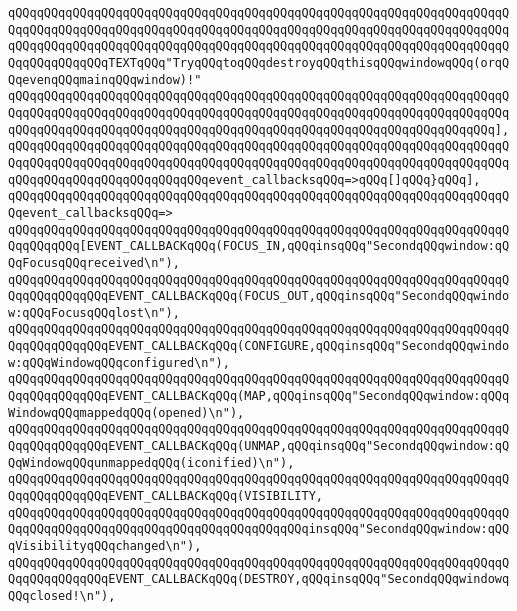 \verb|qQQqqQQqqQQqqQQqqQQqqQQqqQQqqQQqqQQqqQQqqQQqqQQqqQQqqQQqqQQqqQQqqQQqqQQqqQQqqQQqqQQqqQQqqQQqqQQqqQQqqQQqqQQqqQQqqQQqqQQqqQQqqQQqqQQqqQQqqQQqqQQqqQQqqQQqqQQqqQQqqQQqqQQqqQQqqQQqqQQqqQQqqQQqqQQqqQQqqQQqqQQqqQQqqQQqqQQqqQQqqQQqTEXTqQQq"TryqQQqtoqQQqdestroyqQQqthisqQQqwindowqQQq(orqQQqevenqQQqmainqQQqwindow)!"|\newline
\verb|qQQqqQQqqQQqqQQqqQQqqQQqqQQqqQQqqQQqqQQqqQQqqQQqqQQqqQQqqQQqqQQqqQQqqQQqqQQqqQQqqQQqqQQqqQQqqQQqqQQqqQQqqQQqqQQqqQQqqQQqqQQqqQQqqQQqqQQqqQQqqQQqqQQqqQQqqQQqqQQqqQQqqQQqqQQqqQQqqQQqqQQqqQQqqQQqqQQqqQQqqQQqqQQq],|\newline
\verb|qQQqqQQqqQQqqQQqqQQqqQQqqQQqqQQqqQQqqQQqqQQqqQQqqQQqqQQqqQQqqQQqqQQqqQQqqQQqqQQqqQQqqQQqqQQqqQQqqQQqqQQqqQQqqQQqqQQqqQQqqQQqqQQqqQQqqQQqqQQqqQQqqQQqqQQqqQQqqQQqqQQqqQQqevent_callbacksqQQq=>qQQq[]qQQq}qQQq],|\newline
\verb|qQQqqQQqqQQqqQQqqQQqqQQqqQQqqQQqqQQqqQQqqQQqqQQqqQQqqQQqqQQqqQQqqQQqqQQqevent_callbacksqQQq=>|\newline
\verb|qQQqqQQqqQQqqQQqqQQqqQQqqQQqqQQqqQQqqQQqqQQqqQQqqQQqqQQqqQQqqQQqqQQqqQQqqQQqqQQq[EVENT_CALLBACKqQQq(FOCUS_IN,qQQqinsqQQq"SecondqQQqwindow:qQQqFocusqQQqreceived\n"),|\newline
\verb|qQQqqQQqqQQqqQQqqQQqqQQqqQQqqQQqqQQqqQQqqQQqqQQqqQQqqQQqqQQqqQQqqQQqqQQqqQQqqQQqqQQqEVENT_CALLBACKqQQq(FOCUS_OUT,qQQqinsqQQq"SecondqQQqwindow:qQQqFocusqQQqlost\n"),|\newline
\verb|qQQqqQQqqQQqqQQqqQQqqQQqqQQqqQQqqQQqqQQqqQQqqQQqqQQqqQQqqQQqqQQqqQQqqQQqqQQqqQQqqQQqEVENT_CALLBACKqQQq(CONFIGURE,qQQqinsqQQq"SecondqQQqwindow:qQQqWindowqQQqconfigured\n"),|\newline
\verb|qQQqqQQqqQQqqQQqqQQqqQQqqQQqqQQqqQQqqQQqqQQqqQQqqQQqqQQqqQQqqQQqqQQqqQQqqQQqqQQqqQQqEVENT_CALLBACKqQQq(MAP,qQQqinsqQQq"SecondqQQqwindow:qQQqWindowqQQqmappedqQQq(opened)\n"),|\newline
\verb|qQQqqQQqqQQqqQQqqQQqqQQqqQQqqQQqqQQqqQQqqQQqqQQqqQQqqQQqqQQqqQQqqQQqqQQqqQQqqQQqqQQqEVENT_CALLBACKqQQq(UNMAP,qQQqinsqQQq"SecondqQQqwindow:qQQqWindowqQQqunmappedqQQq(iconified)\n"),|\newline
\verb|qQQqqQQqqQQqqQQqqQQqqQQqqQQqqQQqqQQqqQQqqQQqqQQqqQQqqQQqqQQqqQQqqQQqqQQqqQQqqQQqqQQqEVENT_CALLBACKqQQq(VISIBILITY,|\newline
\verb|qQQqqQQqqQQqqQQqqQQqqQQqqQQqqQQqqQQqqQQqqQQqqQQqqQQqqQQqqQQqqQQqqQQqqQQqqQQqqQQqqQQqqQQqqQQqqQQqqQQqqQQqqQQqqQQqinsqQQq"SecondqQQqwindow:qQQqVisibilityqQQqchanged\n"),|\newline
\verb|qQQqqQQqqQQqqQQqqQQqqQQqqQQqqQQqqQQqqQQqqQQqqQQqqQQqqQQqqQQqqQQqqQQqqQQqqQQqqQQqqQQqEVENT_CALLBACKqQQq(DESTROY,qQQqinsqQQq"SecondqQQqwindowqQQqclosed!\n"),|\newline
